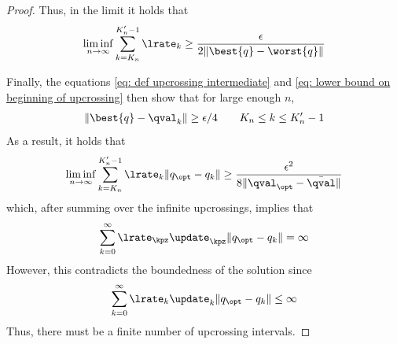 \begin{proof}
Thus, in the limit it holds that
\begin{align}
    \liminf_{n \to \infty} \sum_{k = K_n}^{K'_n -1} \lrate_k \geq \dfrac{\epsilon}{2 \| \best{q} - \worst{q} \|}
\end{align}


Finally, the equations \eqref{eq: def upcrossing intermediate} and \eqref{eq: lower bound on beginning of upcrossing} then show that for large enough $n$, 
\begin{align}
    \| \best{q} - \qval_k \| \geq \epsilon/4 \quad\quad K_n \leq k \leq K_n' - 1
\end{align}
As a result, it holds that
\begin{align}
    \liminf_{n \to \infty} \sum_{k = K_n}^{K'_n -1} \lrate_k \| q_\opt - q_k \|
    \geq 
    \dfrac{\epsilon^2}{8 \| \qval_\opt - \Bar{\qval} \|}
\end{align}
which, after summing over the infinite upcrossings, implies that
\begin{align}
    \sum_{k = 0}^\infty \lrate_\kpz \update_\kpz \| q_\opt - q_k\| 
    = \infty
\end{align}
However, this contradicts the boundedness of the solution since 
\begin{align}
    \sum_{k = 0}^\infty \lrate_k \update_k \| q_\opt - q_k\|
    \leq \infty
\end{align}
Thus, there must be a finite number of upcrossing intervals.
\end{proof}

